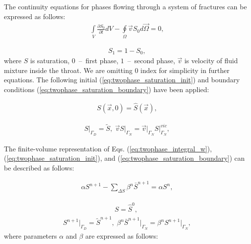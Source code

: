 \documentclass[a4paper,12pt]{extreport}
\begin{document}
  The continuity equations for phases flowing through a system of fractures can be expressed as follows:
  \begin{eqnarray}
  \label{eq:twophase_integral_w}
  \int \limits_{V} \frac{\partial S_0}{\partial t} d V - \oint \limits_{\Omega} \vec{v}S_0 d\vec{\Omega} = 0,
  \end{eqnarray}
  
  \begin{eqnarray}
  \label{eq:twophase_gas_phase}
  S_1 = 1 - S_0,
  \end{eqnarray}
  where  $S$ is saturation, $0$~--~first phase, $1$~--~second phase, $\vec{v}$ is velocity of fluid mixture inside the throat. We are omitting $0$ index for simplicity in further equations.
 \newpage
The following initial (\ref{eq:twophase_saturation_init}) and boundary conditions (\ref{eq:twophase_saturation_boundary}) have been applied:
  
  \begin{eqnarray}
  \label{eq:twophase_saturation_init}
  S \left(\vec{x}, \mathit{0}\right) = \hat{S} \left(\vec{x}\right),
  \end{eqnarray}
  
  \begin{eqnarray}
  \label{eq:twophase_saturation_boundary}
  S \Big|_{\mathit{\Gamma}_D} \!\!= \tilde{S}, \; \vec{v}S \Big|_{\mathit{\Gamma}_N} \!\!= \vec{v}\Big|_{\mathit{\Gamma}_N}S \Big|^{vic}_{\mathit{\Gamma}_N},
  \end{eqnarray}
  
  The finite-volume representation of Eqs. (\ref{eq:twophase_integral_w}), (\ref{eq:twophase_saturation_init}), and (\ref{eq:twophase_saturation_boundary}) can be described as follows:
  
   \begin{eqnarray}
  \label{eq:twophase_num}
  \alpha S^{n+\mathit{1}} -  \sum_{\Delta S} \beta^n\bar{S}^{n+1} =   \alpha S^{n},
  \end{eqnarray}
  
  \begin{eqnarray}
  \label{eq:twophase_num_init}
  S = \hat{S}^{\mathit{0}}, \; 
  \end{eqnarray}
  \begin{eqnarray}
  \label{eq:twophase_num_bound}
  S^{n+\mathit 1}  \Big|_{\mathit{\Gamma}_D}= \tilde{S}^{n+\mathit 1}, \; \beta^n \bar{S}^{n+\mathit 1} \Big|_{\mathit{\Gamma}_N} \!\!= \beta^n S^{n+\mathit 1} \Big|_{\mathit{\Gamma}_N},
  \end{eqnarray}
  where parameters $\alpha$ and $\beta$ are expressed as follows:
  
\end{document}
